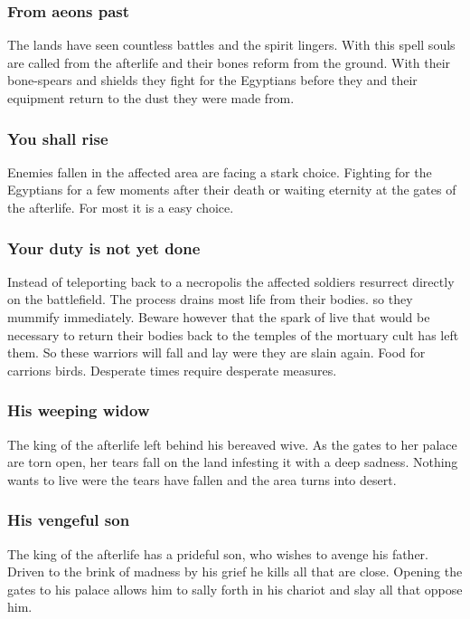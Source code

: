 \documentclass[a4paper]{book}
\begin{document}
		\subsubsection{From aeons past}
			The lands have seen countless battles and the spirit lingers.
			With this spell souls are called from the afterlife
			and their bones reform from the ground.
			With their bone-spears and shields they fight for the \gls{Egyptians}
			before they and their equipment return to the dust they were made from.

		\subsubsection{You shall rise}
			Enemies fallen in the affected area are facing a stark choice.
			Fighting for the \gls{Egyptians} for a few moments after their death
			or waiting eternity at the gates of the afterlife.
			For most it is a easy choice.

		\subsubsection{Your duty is not yet done}
			Instead of teleporting back to a necropolis the affected soldiers
			resurrect directly on the battlefield.
			The process drains most life from their bodies.
			so they mummify immediately.
			Beware however that the spark of live that would be necessary
			to return their bodies back to the temples of the mortuary cult
			has left them.
			So these warriors will fall and lay were they are slain again.
			Food for carrions birds.
			Desperate times require desperate measures.

		\subsubsection{His weeping widow}
			The king of the afterlife left behind his bereaved wive.
			As the gates to her palace are torn open,
			her tears fall on the land infesting it with a deep sadness.
			Nothing wants to live were the tears have fallen and the area turns into desert.

		\subsubsection{His vengeful son}
			The king of the afterlife has a prideful son,
			who wishes to avenge his father.
			Driven to the brink of madness by his grief he kills all that are close.
			Opening the gates to his palace allows him to sally forth in his chariot
			and slay all that oppose him.
\end{document}
